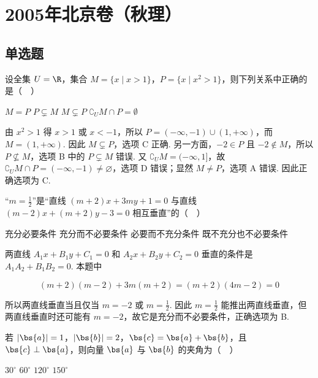 \chapter{2005年北京卷（秋理）}
\section{单选题}
\begin{problem}
设全集 \(U=\R\)，集合 \(M=\{x\mid x>1\}\)，\(P=\{x\mid x^2>1\}\)，则下列关系中正确的是（\(\quad\)）

\choices
    {\(M=P\)}
    {\(P \subsetneq M\)}
    {\(M \subsetneq P\)}
    {\(\complement_U M \cap P=\emptyset\)}
\end{problem}

\begin{solution}
由 \(x^2>1\) 得 \(x>1\) 或 \(x<-1\)，所以 \(P=(-\infty,-1)\cup(1,+\infty)\)，而 \(M=(1,+\infty)\). 因此 \(M\subsetneq P\)，选项 C 正确. 另一方面，\(-2\in P\) 且 \(-2\notin M\)，所以 \(P\not\subseteq M\)，选项 B 中的 \(P\subsetneq M\) 错误. 又 \(\complement_U M=(-\infty,1]\)，故 \(\complement_U M\cap P=(-\infty,-1)\ne\varnothing\)，选项 D 错误；显然 \(M\ne P\)，选项 A 错误. 因此正确选项为 C.
\end{solution}

\begin{problem}
“\(m=\frac{1}{2}\)”是“直线 \((m+2)x+3my+1=0\) 与直线 \((m-2)x+(m+2)y-3=0\) 相互垂直”的（\(\quad\)）

\choices
    {充分必要条件}
    {充分而不必要条件}
    {必要而不充分条件}
    {既不充分也不必要条件}
\end{problem}

\begin{solution}
两直线 \(A_1x+B_1y+C_1=0\) 和 \(A_2x+B_2y+C_2=0\) 垂直的条件是 \(A_1A_2+B_1B_2=0\). 本题中

\[
(m+2)(m-2)+3m(m+2)=(m+2)(4m-2)=0
\]

所以两直线垂直当且仅当 \(m=-2\) 或 \(m=\frac12\). 因此 \(m=\frac12\) 能推出两直线垂直，但两直线垂直时还可能有 \(m=-2\)，故它是充分而不必要条件，正确选项为 B.
\end{solution}

\begin{problem}
若 \(\left|\bs{a}\right|=1\)，\(\left|\bs{b}\right|=2\)，\(\bs{c}=\bs{a}+\bs{b}\)，且 \(\bs{c}\perp\bs{a}\)，则向量 \(\bs{a}\) 与 \(\bs{b}\) 的夹角为（\(\quad\)）

\choices
    {\(30^{\circ}\)}
    {\(60^{\circ}\)}
    {\(120^{\circ}\)}
    {\(150^{\circ}\)}
\end{problem}


